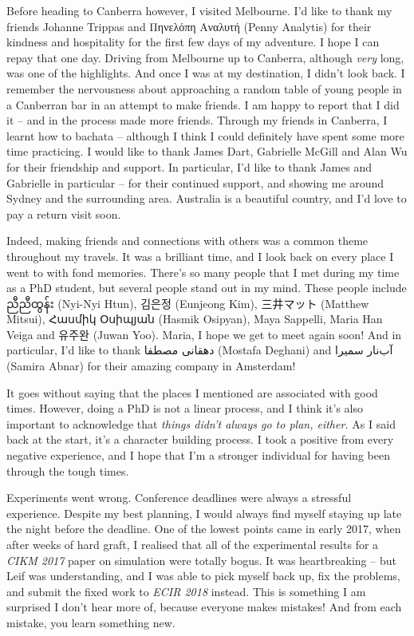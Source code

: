 \begin{preamble}
Before heading to Canberra however, I visited Melbourne. I'd like to thank my friends Johanne Trippas and Πηνελόπη Αναλυτή (Penny Analytis) for their kindness and hospitality for the first few days of my adventure. I hope I can repay that one day. Driving from Melbourne up to Canberra, although \emph{very} long, was one of the highlights. And once I was at my destination, I didn't look back. I remember the nervousness about approaching a random table of young people in a Canberran bar in an attempt to make friends. I am happy to report that I did it -- and in the process made more friends. Through my friends in Canberra, I learnt how to bachata -- although I think I could definitely have spent some more time practicing. I would like to thank James Dart, Gabrielle McGill and Alan Wu for their friendship and support. In particular, I'd like to thank James and Gabrielle in particular -- for their continued support, and showing me around Sydney and the surrounding area. Australia is a beautiful country, and I'd love to pay a return visit soon.

Indeed, making friends and connections with others was a common theme throughout my travels. It was a brilliant time, and I look back on every place I went to with fond memories. There's so many people that I met during my time as a PhD student, but several people stand out in my mind. These people include {\burmesefont ညီညီထွန်း} (Nyi-Nyi Htun), {\asianfont 김은정} (Eunjeong Kim), {\asianfont 三井マット} (Matthew Mitsui), {\armenianfont Հասմիկ Օսիպյան} (Hasmik Osipyan), Maya Sappelli, Maria Han Veiga and {\asianfont 유주완} (Juwan Yoo). Maria, I hope we get to meet again soon! And in particular, I'd like to thank {\farsifont دهقانی مصطفا} (Mostafa Deghani) and {\farsifont آب‌نار سمیرا} (Samira Abnar) for their amazing company in Amsterdam!

It goes without saying that the places I mentioned are associated with good times. However, doing a PhD is not a linear process, and I think it's also important to acknowledge that \emph{things didn't always go to plan, either.} As I said back at the start, it's a character building process. I took a positive from every negative experience, and I hope that I'm a stronger individual for having been through the tough times.

Experiments went wrong. Conference deadlines were always a stressful experience. Despite my best planning, I would always find myself staying up late the night before the deadline. One of the lowest points came in early 2017, when after weeks of hard graft, I realised that all of the experimental results for a \emph{CIKM 2017} paper on simulation were totally bogus. It was heartbreaking -- but Leif was understanding, and I was able to pick myself back up, fix the problems, and submit the fixed work to \emph{ECIR 2018} instead. This is something I am surprised I don't hear more of, because everyone makes mistakes! And from each mistake, you learn something new.


\end{preamble}
